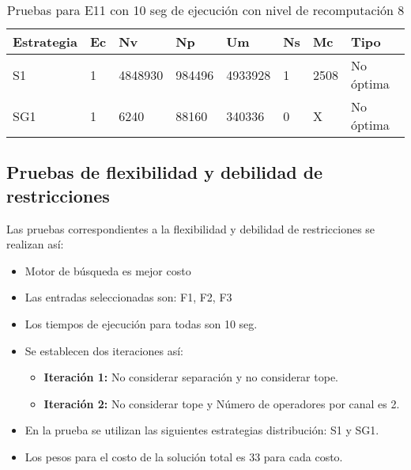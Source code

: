 \begin{center}
\begin{longtable}{|p{3cm}|p{1.0cm}|p{1.6cm}|p{1.6cm}|p{1.1cm}|p{1.1cm}|p{1.1cm}|p{2.7cm}|}
	\caption{Pruebas para E11 con 10 seg de ejecución con nivel de recomputación 8} \\
	\hline
	\cellcolor[gray]{0.9} \textbf{Estrategia} & \cellcolor[gray]{0.9}\textbf{Ec} & \cellcolor[gray]{0.9}\textbf{Nv} & \cellcolor[gray]{0.9}\textbf{Np} & \cellcolor[gray]{0.9}\textbf{Um} & \cellcolor[gray]{0.9}\textbf{Ns} &  \cellcolor[gray]{0.9}\textbf{Mc} & \cellcolor[gray]{0.9}\textbf{Tipo}\\	\hline
	S1& 1 &4848930  &984496 &4933928  &1 &2508&No óptima \\
	\hline
	SG1& 1 &6240  &88160 &340336  &0 &X&No óptima \\
	\hline
\end{longtable}	
\end{center}

\subsection{Pruebas de flexibilidad y debilidad de restricciones}

Las pruebas correspondientes a la flexibilidad y debilidad de restricciones se realizan así:


\begin{itemize}
	\item Motor de búsqueda es mejor costo
	\item Las entradas seleccionadas son: F1, F2, F3
	\item Los tiempos de ejecución para todas son 10 seg.
	\item {Se establecen dos iteraciones así:
		\begin{itemize}
			\item \textbf{Iteración 1:} No considerar separación y no considerar tope.
			\item \textbf{Iteración 2:} No considerar tope y Número de operadores por canal es 2.
		\end{itemize}
	}
	\item En la prueba se utilizan las siguientes estrategias distribución: S1 y SG1.
	\item Los pesos para el costo de la solución total es 33 para cada costo.
\end{itemize}


